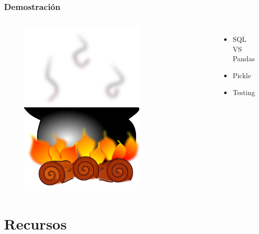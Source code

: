 \documentclass{beamer}
\begin{document}
\begin{frame}
\frametitle{Demostración}
\begin{columns}[c] %

  \begin{figure}
    \centering
    \includegraphics[width=0.7\textwidth]{olla.png}
  \end{figure}

\begin{itemize}
\item SQL VS Pandas
\item Pickle
\item Testing
\end{itemize}

\end{columns}
\end{frame}

\section{Recursos}
\end{document}
